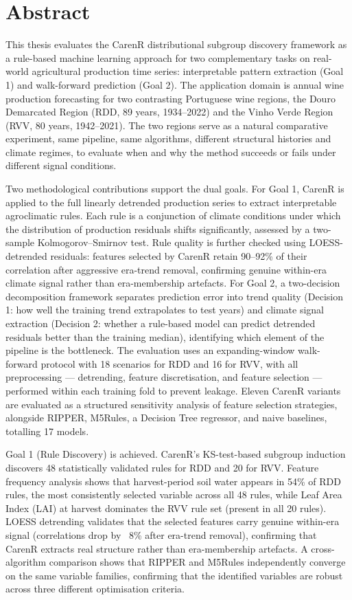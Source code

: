 
\chapter*{Abstract}

This thesis evaluates the CarenR distributional subgroup discovery framework as a rule-based machine learning approach for two complementary tasks on real-world agricultural production time series: interpretable pattern extraction (Goal 1) and walk-forward prediction (Goal 2). The application domain is annual wine production forecasting for two contrasting Portuguese wine regions, the Douro Demarcated Region (RDD, 89 years, 1934--2022) and the Vinho Verde Region (RVV, 80 years, 1942--2021). The two regions serve as a natural comparative experiment, same pipeline, same algorithms, different structural histories and climate regimes, to evaluate when and why the method succeeds or fails under different signal conditions.

Two methodological contributions support the dual goals. For Goal 1, CarenR is applied to the full linearly detrended production series to extract interpretable agroclimatic rules. Each rule is a conjunction of climate conditions under which the distribution of production residuals shifts significantly, assessed by a two-sample Kolmogorov--Smirnov test. Rule quality is further checked using LOESS-detrended residuals: features selected by CarenR retain 90--92\% of their correlation after aggressive era-trend removal, confirming genuine within-era climate signal rather than era-membership artefacts. For Goal 2, a two-decision decomposition framework separates prediction error into trend quality (Decision 1: how well the training trend extrapolates to test years) and climate signal extraction (Decision 2: whether a rule-based model can predict detrended residuals better than the training median), identifying which element of the pipeline is the bottleneck. The evaluation uses an expanding-window walk-forward protocol with 18 scenarios for RDD and 16 for RVV, with all preprocessing --- detrending, feature discretisation, and feature selection --- performed within each training fold to prevent leakage. Eleven CarenR variants are evaluated as a structured sensitivity analysis of feature selection strategies, alongside RIPPER, M5Rules, a Decision Tree regressor, and naive baselines, totalling 17 models.

Goal 1 (Rule Discovery) is achieved. CarenR's KS-test-based subgroup induction discovers 48 statistically validated rules for RDD and 20 for RVV. Feature frequency analysis shows that harvest-period soil water appears in 54\% of RDD rules, the most consistently selected variable across all 48 rules, while Leaf Area Index (LAI) at harvest dominates the RVV rule set (present in all 20 rules). LOESS detrending validates that the selected features carry genuine within-era signal (correlations drop by ~8\% after era-trend removal), confirming that CarenR extracts real structure rather than era-membership artefacts. A cross-algorithm comparison shows that RIPPER and M5Rules independently converge on the same variable families, confirming that the identified variables are robust across three different optimisation criteria.

